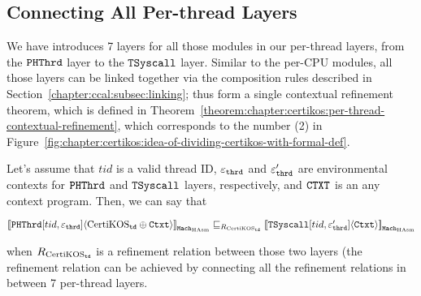 \subsection{Connecting All Per-thread Layers}
\label{chapter:certikos:subsec:connecting-all-thread-layers}

We have introduces 7 layers for all those modules in our per-thread layers, from the ${{\mathrm{\texttt{PHThrd}}}}$ layer to the 
${{\mathrm{\texttt{TSyscall}}}}$ layer.
Similar to the per-CPU modules, all those layers can be linked together via the composition rules described in Section~\ref{chapter:ccal:subsec:linking};
thus form a single contextual refinement theorem, which is defined in Theorem~\ref{theorem:chapter:certikos:per-thread-contextual-refinement},
which corresponds to the number (2) in Figure~\ref{fig:chapter:certikos:idea-of-dividing-certikos-with-formal-def}.
\begin{theorem}
\label{theorem:chapter:certikos:per-thread-contextual-refinement}
Let's assume that $tid$ is a valid thread ID, ${\varepsilon}_{{\mathrm{\texttt{thrd}}}}$ and  ${\varepsilon}'_{{\mathrm{\texttt{thrd}}}}$ are environmental contexts for 
${{\mathrm{\texttt{PHThrd}}}}$  and ${{\mathrm{\texttt{TSyscall}}}}$ layers, respectively, and ${\mathrm{\texttt{CTXT}}}$ is an any context program. Then, we can say that
\begin{center}
${[\![{{{\mathrm{\texttt{PHThrd}}}}[tid, {\varepsilon}_{{\mathrm{\texttt{thrd}}}}]} \langle {\mathrm{CertiKOS}_{{\mathrm{\texttt{td}}}} \oplus {\mathrm{\texttt{Ctxt}}}} \rangle]\!]}_{{\mathrm{\texttt{Mach}}}_{\mathrm{HAsm}}} \sqsubseteq_{R_{\mathrm{CertiKOS}_{\mathrm{\texttt{td}}}}} {[\![{{{\mathrm{\texttt{TSyscall}}}}[tid, {\varepsilon}'_{{\mathrm{\texttt{thrd}}}}]} \langle {{\mathrm{\texttt{Ctxt}}}} \rangle]\!]}_{{\mathrm{\texttt{Mach}}}_{\mathrm{HAsm}}}$
\end{center}
when ${R_{\mathrm{CertiKOS}_{\mathrm{\texttt{td}}}}}$ is a refinement relation between those two layers (the refinement relation can be achieved by 
connecting all the refinement relations in between 7 per-thread layers.
\end{theorem}


